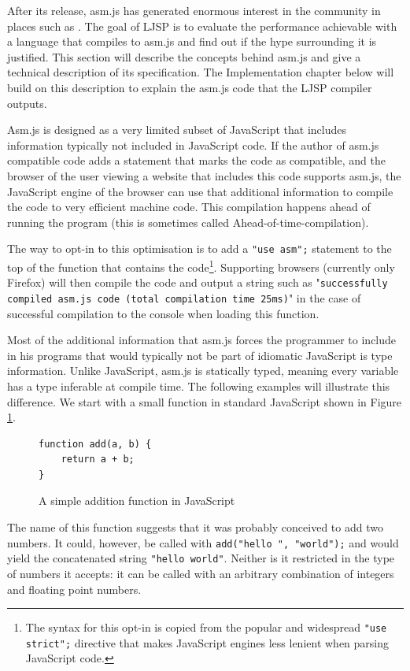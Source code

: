 \documentclass[11pt]{report}
\begin{document}
After its release, asm.js has generated enormous interest in the community in places such as \cite{hnthread}. The goal of LJSP is to evaluate the performance achievable with a language that compiles to asm.js and find out if the hype surrounding it is justified. This section will describe the concepts behind asm.js and give a technical description of its specification. The Implementation chapter below will build on this description to explain the asm.js code that the LJSP compiler outputs.

Asm.js is designed as a very limited subset of JavaScript that includes information typically not included in JavaScript code. If the author of asm.js compatible code adds a statement that marks the code as compatible, and the browser of the user viewing a website that includes this code supports asm.js, the JavaScript engine of the browser can use that additional information to compile the code to very efficient machine code. This compilation happens ahead of running the program (this is sometimes called Ahead-of-time-compilation).

The way to opt-in to this optimisation is to add a \texttt{"use asm";} statement to the top of the function that contains the code\footnote{The syntax for this opt-in is copied from the popular and widespread \texttt{"use strict";} directive that makes JavaScript engines less lenient when parsing JavaScript code.}. Supporting browsers (currently only Firefox) will then compile the code and output a string such as "\texttt{successfully compiled asm.js code (total compilation time 25ms)}" in the case of successful compilation to the console when loading this function.

Most of the additional information that asm.js forces the programmer to include in his programs that would typically not be part of idiomatic JavaScript is type information. Unlike JavaScript, asm.js is statically typed, meaning every variable has a type inferable at compile time. The following examples will illustrate this difference. We start with a small function in standard JavaScript shown in Figure \ref{jssimplefunc}.

\begin{figure}[ht]
\begin{lstlisting}
function add(a, b) {
    return a + b;
}
\end{lstlisting}
\caption{A simple addition function in JavaScript}
\label{jssimplefunc}
\end{figure}

The name of this function suggests that it was probably conceived to add two numbers. It could, however, be called with \texttt{add("hello ", "world");} and would yield the concatenated string \texttt{"hello world"}. Neither is it restricted in the type of numbers it accepts: it can be called with an arbitrary combination of integers and floating point numbers.
\end{document}
